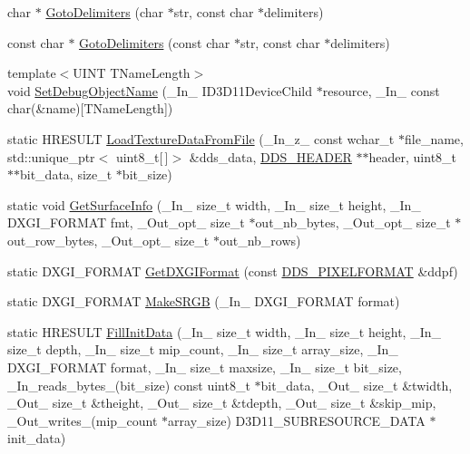 \begin{DoxyCompactItemize}
\item 
char $\ast$ \hyperlink{namespacemage_a1f8c73ddfbe8a370be1800627136b2ca}{Goto\+Delimiters} (char $\ast$str, const char $\ast$delimiters)
\item 
const char $\ast$ \hyperlink{namespacemage_a3cbc104feb30a9abd8dcec1a77b918b0}{Goto\+Delimiters} (const char $\ast$str, const char $\ast$delimiters)
\item 
{\footnotesize template$<$U\+I\+NT T\+Name\+Length$>$ }\\void \hyperlink{namespacemage_a88833e1a7c6ad614ff6e88cb10eff532}{Set\+Debug\+Object\+Name} (\+\_\+\+In\+\_\+ I\+D3\+D11\+Device\+Child $\ast$resource, \+\_\+\+In\+\_\+ const char(\&name)\mbox{[}T\+Name\+Length\mbox{]})
\item 
static H\+R\+E\+S\+U\+LT \hyperlink{namespacemage_ad1df9b8a27dd30528717777fd0c9c3db}{Load\+Texture\+Data\+From\+File} (\+\_\+\+In\+\_\+z\+\_\+ const wchar\+\_\+t $\ast$file\+\_\+name, std\+::unique\+\_\+ptr$<$ uint8\+\_\+t\mbox{[}$\,$\mbox{]}$>$ \&dds\+\_\+data, \hyperlink{structmage_1_1_d_d_s___h_e_a_d_e_r}{D\+D\+S\+\_\+\+H\+E\+A\+D\+ER} $\ast$$\ast$header, uint8\+\_\+t $\ast$$\ast$bit\+\_\+data, size\+\_\+t $\ast$bit\+\_\+size)
\item 
static void \hyperlink{namespacemage_a7b67bb6f38f3e787fb3561d236b88bd2}{Get\+Surface\+Info} (\+\_\+\+In\+\_\+ size\+\_\+t width, \+\_\+\+In\+\_\+ size\+\_\+t height, \+\_\+\+In\+\_\+ D\+X\+G\+I\+\_\+\+F\+O\+R\+M\+AT fmt, \+\_\+\+Out\+\_\+opt\+\_\+ size\+\_\+t $\ast$out\+\_\+nb\+\_\+bytes, \+\_\+\+Out\+\_\+opt\+\_\+ size\+\_\+t $\ast$out\+\_\+row\+\_\+bytes, \+\_\+\+Out\+\_\+opt\+\_\+ size\+\_\+t $\ast$out\+\_\+nb\+\_\+rows)
\item 
static D\+X\+G\+I\+\_\+\+F\+O\+R\+M\+AT \hyperlink{namespacemage_a4fecf9823aec7c5ba078acf6bd73f983}{Get\+D\+X\+G\+I\+Format} (const \hyperlink{structmage_1_1_d_d_s___p_i_x_e_l_f_o_r_m_a_t}{D\+D\+S\+\_\+\+P\+I\+X\+E\+L\+F\+O\+R\+M\+AT} \&ddpf)
\item 
static D\+X\+G\+I\+\_\+\+F\+O\+R\+M\+AT \hyperlink{namespacemage_a35ccdb42bbc027d3678b849fb962f3d3}{Make\+S\+R\+GB} (\+\_\+\+In\+\_\+ D\+X\+G\+I\+\_\+\+F\+O\+R\+M\+AT format)
\item 
static H\+R\+E\+S\+U\+LT \hyperlink{namespacemage_ac20162a68be6828c38072a3afb0711c1}{Fill\+Init\+Data} (\+\_\+\+In\+\_\+ size\+\_\+t width, \+\_\+\+In\+\_\+ size\+\_\+t height, \+\_\+\+In\+\_\+ size\+\_\+t depth, \+\_\+\+In\+\_\+ size\+\_\+t mip\+\_\+count, \+\_\+\+In\+\_\+ size\+\_\+t array\+\_\+size, \+\_\+\+In\+\_\+ D\+X\+G\+I\+\_\+\+F\+O\+R\+M\+AT format, \+\_\+\+In\+\_\+ size\+\_\+t maxsize, \+\_\+\+In\+\_\+ size\+\_\+t bit\+\_\+size, \+\_\+\+In\+\_\+reads\+\_\+bytes\+\_\+(bit\+\_\+size) const uint8\+\_\+t $\ast$bit\+\_\+data, \+\_\+\+Out\+\_\+ size\+\_\+t \&twidth, \+\_\+\+Out\+\_\+ size\+\_\+t \&theight, \+\_\+\+Out\+\_\+ size\+\_\+t \&tdepth, \+\_\+\+Out\+\_\+ size\+\_\+t \&skip\+\_\+mip, \+\_\+\+Out\+\_\+writes\+\_\+(mip\+\_\+count $\ast$array\+\_\+size) D3\+D11\+\_\+\+S\+U\+B\+R\+E\+S\+O\+U\+R\+C\+E\+\_\+\+D\+A\+TA $\ast$init\+\_\+data)

\end{DoxyCompactItemize}
